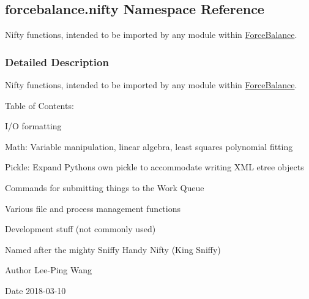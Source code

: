 \hypertarget{namespaceforcebalance_1_1nifty}{}\subsection{forcebalance.\+nifty Namespace Reference}
\label{namespaceforcebalance_1_1nifty}


Nifty functions, intended to be imported by any module within \hyperlink{namespaceForceBalance}{Force\+Balance}.  




\subsubsection{Detailed Description}
Nifty functions, intended to be imported by any module within \hyperlink{namespaceForceBalance}{Force\+Balance}. 

Table of Contents\+:
\begin{DoxyItemize}
\item I/O formatting
\item Math\+: Variable manipulation, linear algebra, least squares polynomial fitting
\item Pickle\+: Expand Python\textquotesingle{}s own pickle to accommodate writing X\+ML etree objects
\item Commands for submitting things to the Work Queue
\item Various file and process management functions
\item Development stuff (not commonly used)
\end{DoxyItemize}

Named after the mighty Sniffy Handy Nifty (King Sniffy)

\begin{DoxyAuthor}{Author}
Lee-\/\+Ping Wang 
\end{DoxyAuthor}
\begin{DoxyDate}{Date}
2018-\/03-\/10 
\end{DoxyDate}

